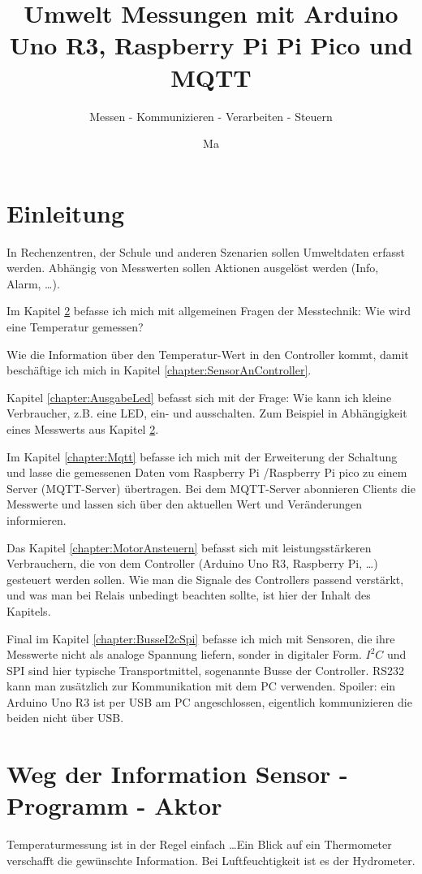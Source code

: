 \documentclass[paper = a4]{scrreprt}
\title{Umwelt Messungen mit Arduino Uno R3, Raspberry Pi Pi Pico und MQTT}
\subtitle{Messen - Kommunizieren - Verarbeiten - Steuern}
\author{Ma}
\begin{document}
\maketitle

\tableofcontents
\chapter{Einleitung}
In Rechenzentren, der Schule und anderen Szenarien sollen Umweltdaten erfasst werden. Abhängig von Messwerten sollen Aktionen ausgelöst werden (Info, Alarm, \dots).

Im Kapitel \ref{chapter:Sensor} befasse ich mich mit allgemeinen Fragen der Messtechnik: Wie wird eine Temperatur gemessen?

Wie die Information über den Temperatur-Wert in den Controller kommt, damit beschäftige ich mich in Kapitel \ref{chapter:SensorAnController}.

Kapitel \ref{chapter:AusgabeLed} befasst sich mit der Frage: Wie kann ich kleine Verbraucher, z.B. eine LED, ein- und ausschalten. Zum Beispiel in Abhängigkeit eines Messwerts aus  Kapitel \ref{chapter:Sensor}.

Im Kapitel \ref{chapter:Mqtt} befasse ich mich mit der Erweiterung der Schaltung und lasse die gemessenen Daten vom Raspberry Pi /Raspberry Pi pico zu einem Server (MQTT-Server) übertragen. Bei dem MQTT-Server abonnieren Clients die Messwerte und lassen sich über den aktuellen Wert und Veränderungen informieren.

Das Kapitel \ref{chapter:MotorAnsteuern} befasst sich mit leistungsstärkeren Verbrauchern, die von dem Controller (Arduino Uno R3, Raspberry Pi, \dots) gesteuert werden sollen. Wie man die Signale des Controllers passend verstärkt, und was man bei Relais unbedingt beachten sollte, ist hier der Inhalt des Kapitels.

Final im Kapitel \ref{chapter:BusseI2cSpi} befasse ich mich mit Sensoren, die ihre Messwerte nicht als analoge Spannung liefern, sonder in digitaler Form. $I^2C$ und SPI sind hier typische Transportmittel, sogenannte Busse der Controller. RS232 kann man zusätzlich zur Kommunikation mit dem PC verwenden. Spoiler: ein Arduino Uno R3 ist per USB am PC angeschlossen, eigentlich kommunizieren die beiden nicht über USB.


\chapter{Weg der Information Sensor - Programm - Aktor}
\label{chapter:Sensor}
Temperaturmessung ist in der Regel einfach \dots Ein Blick auf ein Thermometer verschafft die gewünschte Information. Bei Luftfeuchtigkeit ist es der Hydrometer.
\end{document}
